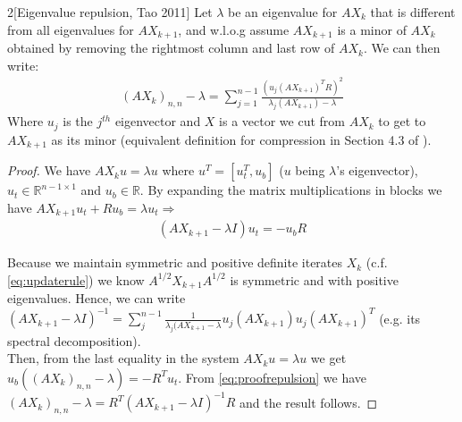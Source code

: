 \documentclass[12pt,conference,compsocconf]{IEEEtran}
\newcommand{\R}{\mathbb{R}}
\begin{document}
\begin{customcorollary}{2}[Eigenvalue repulsion, Tao 2011]
Let $\lambda$ be an eigenvalue for $AX_{k}$ that is different from all eigenvalues for $AX_{k+1}$, and w.l.o.g assume $AX_{k+1}$ is a minor of $AX_k$ obtained by removing the rightmost column and last row of $AX_k$. We can then write:
\begin{align}\label{eq:eigvalequation}
	(AX_{k})_{n,n}-\lambda = \sum_{j=1}^{n-1}\frac{(u_j(AX_{k+1})^TR)^2}{\lambda_j(AX_{k+1})-\lambda}
\end{align}
Where $u_j$ is the $j^{th}$ eigenvector and $X$ is a vector we cut from $AX_k$ to get to $AX_{k+1}$ as its minor (equivalent definition for compression in Section 4.3 of \cite{Horn}).

\begin{proof}
We have $AX_ku=\lambda u$ where $u^T=[u_t^T ,u_b]$ ($u$ being $\lambda$'s eigenvector), $u_t \in \R^{n-1\times 1}$ and $u_b \in \R$.
 By expanding the matrix multiplications in blocks we have $AX_{k+1}u_t + Ru_b = \lambda u_t \Rightarrow$ 
\begin{align}\label{eq:proofrepulsion}
	(AX_{k+1}-\lambda I)u_t= -u_bR
\end{align}

Because we maintain symmetric and positive definite iterates $X_k$ (c.f. \ref{eq:updaterule}) we know $A^{1/2}X_{k+1}A^{1/2}$ is symmetric and with positive eigenvalues. Hence, we can write $(AX_{k+1}-\lambda I)^{-1}=\sum_j^{n-1} \frac{1}{\lambda_j(AX_{k+1}-\lambda} u_j(AX_{k+1})u_j(AX_{k+1})^T$ (e.g. its spectral decomposition).\\
Then, from the last equality in the system $AX_ku=\lambda u$ we get $u_b((AX_k)_{n,n}-\lambda)=-R^Tu_t$. From \ref{eq:proofrepulsion} we have $(AX_k)_{n,n}-\lambda=R^T(AX_{k+1}-\lambda I)^{-1}R$ and the result follows.
\end{proof}
\end{customcorollary}
\end{document}
